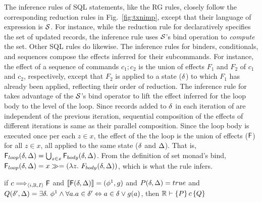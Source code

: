 The inference rules of SQL statements, like the RG rules, closely
follow the corresponding reduction rules in Fig.~\ref{fig:txnimp},
except that their language of expression is $\mathcal{S}$. For instance, while
the reduction rule for  declaratively specifies the set of
updated records, the inference rule uses $\mathcal{S}$'s bind operation to
\emph{compute} the set. Other SQL rules do likewise. The inference
rules for  binders, conditionals, and sequences compose the
effects inferred for their subcommands. For instance, the effect of a
sequence of commands $c_1;c_2$ is the union of effects $F_1$ and $F_2$
of $c_1$ and $c_2$, respectively, except that $F_2$ is applied to a
state ($\delta$) to which $F_1$ has already been applied, reflecting
their order of reduction. The inference rule for  takes
advantage of the $\mathcal{S}$'s bind operator to lift the effect inferred for
the loop body to the level of the loop. Since records added to $\delta$
in each iteration of  are independent of the previous
iteration, sequential composition of the effects of different
iterations is same as their parallel composition. Since the loop body
is executed once per each $z\in x$, the effect of the the loop is the
union of effects (${\sf F}$) for all $z\in x$, all applied to the same
state ($\delta$ and $\Delta$). That is, ${\sf F}_{loop}(\delta,\Delta) =
\bigcup_{z\in x}{\sf F}_{body}(\delta,\Delta)$. From the definition of
set monad's bind, ${\sf F}_{loop}(\delta,\Delta) = x \gg= (\lambda
z.~F_{body}(\delta,\Delta))$, which is what the rule infers.



\begin{theorem}
if $c \Longrightarrow_{\langle i,\mathbb{R},I \rangle} {\sf F}$ and $\llbracket {\sf F}(\delta,\Delta) \rrbracket = (\phi^1,g)$ and
$P(\delta,\Delta) = true$ and $Q(\delta',\Delta) = \exists\delta.~ \phi^1 \wedge
  \forall a. a\in\delta' \Leftrightarrow a\in\delta \vee g(a)$, then
  $\mathbb{R} \vdash \{P\}\,c\,\{Q\}$
\end{theorem}


